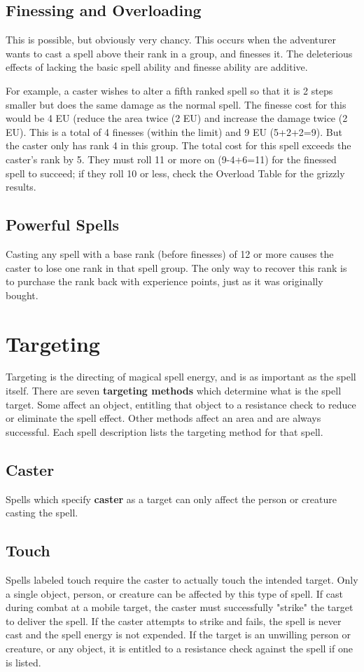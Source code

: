 \begin{multicols*}{2}
\subsection{Finessing and Overloading}
This is possible, but obviously very chancy. This occurs when the adventurer wants to cast a spell above their rank in a group, and finesses it. The deleterious effects of lacking the basic spell ability and finesse ability are additive.

For example, a caster wishes to alter a fifth ranked spell so that it is 2 steps smaller but does the same damage as the normal spell. The finesse cost for this would be 4 EU (reduce the area twice (2 EU) and increase the damage twice (2 EU). This is a total of 4 finesses (within the limit) and 9 EU (5+2+2=9). But the caster only has rank 4 in this group. The total cost for this spell exceeds the caster's rank by 5. They must roll 11 or more on  (9-4+6=11) for the finessed spell to succeed; if they roll 10 or less, check the Overload Table for the grizzly results.
\subsection{Powerful Spells}
Casting any spell with a base rank (before finesses) of 12 or more causes the caster to lose one rank in that spell group. The only way to recover this rank is to purchase the rank back with experience points, just as it was originally bought.
\section{Targeting}
Targeting is the directing of magical spell energy, and is as important as the spell itself. There are seven \textbf{targeting methods} which determine what is the spell target. Some affect an object, entitling that object to a resistance check to reduce or eliminate the spell effect. Other methods affect an area and are always successful. Each spell description lists the targeting method for that spell.
\subsection{Caster}
 Spells which specify \textbf{caster} as a target can only
affect the person or creature casting the spell.
\subsection{Touch}
 Spells labeled touch require the caster to actually touch the intended target. Only a single object, person, or creature can be affected by this type of spell. If cast during combat at a mobile target, the caster must successfully "strike" the target to deliver the spell. If the caster attempts to strike and fails, the spell is never cast and the spell energy is not expended. If the target is an unwilling person or creature,
or any object, it is entitled to a resistance check against the spell if one is listed.

\end{multicols*}
